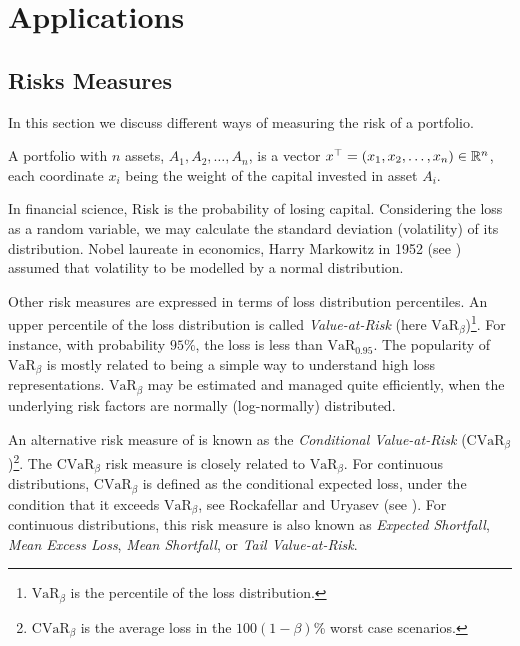 \chapter{Applications} \label{chap:App}
\thispagestyle{empty}

\section{Risks Measures}

In this section we discuss different ways of measuring the risk of a portfolio.
\begin{definition}
	A portfolio with $n$ assets, $A_1, A_2, \dots, A_n$, is a vector $x^\top = (x_1, x_2, \dots, x_n)\in \mathbb{R}^n$, each coordinate $x_i$ being the weight of the capital invested in asset $A_i$.
\end{definition}

In financial science, Risk is the probability of losing capital. Considering the loss as a random variable, we may calculate the standard deviation (volatility) of its distribution. Nobel laureate in economics, Harry Markowitz in 1952 (see \cite{Markowitz1952}) assumed that volatility to be modelled by a normal distribution.


Other risk measures are expressed in terms of loss distribution percentiles. An upper percentile of the loss distribution is called \textit{Value-at-Risk} (here $\mbox{VaR}_\beta$)\footnote{$\mbox{VaR}_\beta$ is the percentile of the loss distribution.}. For instance, with probability $95\%$, the loss is less than $\mbox{VaR}_{0.95}$. The popularity of $\mbox{VaR}_\beta$ is mostly related to being a simple way to understand high loss representations. $\mbox{VaR}_\beta$ may be estimated and managed quite efficiently, when the underlying risk factors are normally (log-normally) distributed.

An alternative risk measure of is known as the \textit{Conditional Value-at-Risk} ($\mbox{CVaR}_\beta$)\footnote{$\mbox{CVaR}_\beta$ is the average loss in the $100(1-\beta)$\% worst case scenarios.}. The $\mbox{CVaR}_\beta$ risk measure is closely related to $\mbox{VaR}_\beta$. For continuous distributions, $\mbox{CVaR}_\beta$ is defined as the conditional expected loss, under the condition that it exceeds $\mbox{VaR}_\beta$, see Rockafellar and Uryasev (see \cite{RockafellarUryasev2001}). For continuous distributions, this risk measure is also known as \emph{Expected Shortfall}, \textit{Mean Excess Loss}, \textit{Mean Shortfall}, or \textit{Tail Value-at-Risk}.


